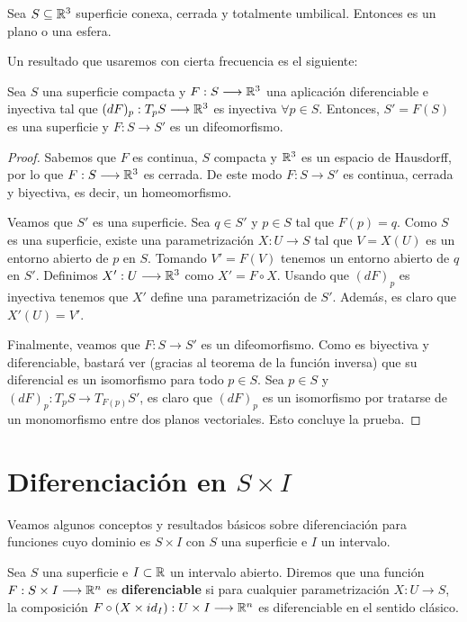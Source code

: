 \begin{theorem}\label{umbilicaltheorem}
Sea $S \subseteq \mathbb{R}^3$ superficie conexa, cerrada y totalmente umbilical. Entonces es un plano o una esfera.
\end{theorem}

Un resultado que usaremos con cierta frecuencia es el siguiente:

\begin{lemma}
Sea $S$ una superficie compacta y $F: S \longrightarrow \mathbb{R}^3$ una aplicación diferenciable e inyectiva tal que $(dF)_p: T_pS \longrightarrow \mathbb{R}^3$ es inyectiva $\forall p \in S$. Entonces, $S' = F(S)$ es una superficie y $F: S \longrightarrow S'$ es un difeomorfismo. 
\end{lemma}
\begin{proof}
Sabemos que $F$ es continua, $S$ compacta y $\mathbb{R}^3$ es un espacio de Hausdorff, por lo que $F: S \longrightarrow \mathbb{R}^3$ es cerrada. De este modo $F: S \longrightarrow S'$ es continua, cerrada y biyectiva, es decir, un homeomorfismo.

Veamos que $S'$ es una superficie. Sea $q \in S'$ y $p \in S$ tal que $F(p)=q$. Como $S$ es una superficie, existe una parametrización $X: U \longrightarrow S$ tal que $V = X(U)$ es un entorno abierto de $p$ en $S$. Tomando $V'=F(V)$ tenemos un entorno abierto de $q$ en $S'$. Definimos $X': U \longrightarrow \mathbb{R}^3$ como $X'=F \circ X$. Usando que $(dF)_p$ es inyectiva tenemos que $X'$ define una parametrización de $S'$. Además, es claro que $X'(U) = V'$.

Finalmente, veamos que $F: S \longrightarrow S'$ es un difeomorfismo. Como es biyectiva y diferenciable, bastará ver (gracias al teorema de la función inversa) que su diferencial es un isomorfismo para todo $p \in S$. Sea $p\in S$ y $(dF)_p: T_pS \longrightarrow T_{F(p)}S'$, es claro que $(dF)_p$ es un isomorfismo por tratarse de un monomorfismo entre dos planos vectoriales. Esto concluye la prueba.
\end{proof}

\section{Diferenciación en $S \times I$}

Veamos algunos conceptos y resultados básicos sobre diferenciación para funciones cuyo dominio es $S \times I$ con $S$ una superficie e $I$ un intervalo.

\begin{definition}
Sea $S$ una superficie e $I \subset \mathbb{R}$ un intervalo abierto. Diremos que una función $F: S \times I \longrightarrow \mathbb{R}^n$ es \textbf{diferenciable} si para cualquier parametrización $X: U \longrightarrow S$, la composición $F \circ (X\times id_I): U \times I \longrightarrow \mathbb{R}^n$ es diferenciable en el sentido clásico.
\end{definition}


